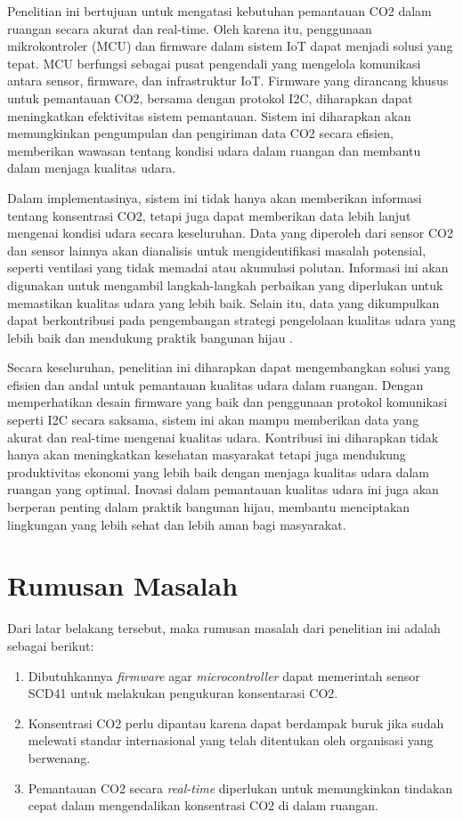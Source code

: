     Penelitian ini bertujuan untuk mengatasi kebutuhan pemantauan CO2 dalam ruangan secara akurat dan real-time.  Oleh karena itu, penggunaan mikrokontroler (MCU) dan firmware dalam sistem IoT dapat menjadi solusi yang tepat. MCU berfungsi sebagai pusat pengendali yang mengelola komunikasi antara sensor, firmware, dan infrastruktur IoT. Firmware yang dirancang khusus untuk pemantauan CO2, bersama dengan protokol I2C, diharapkan dapat meningkatkan efektivitas sistem pemantauan. Sistem ini diharapkan akan memungkinkan pengumpulan dan pengiriman data CO2 secara efisien, memberikan wawasan tentang kondisi udara dalam ruangan dan membantu dalam menjaga kualitas udara.
    
    Dalam implementasinya, sistem ini tidak hanya akan memberikan informasi tentang konsentrasi CO2, tetapi juga dapat memberikan data lebih lanjut mengenai kondisi udara secara keseluruhan. Data yang diperoleh dari sensor CO2 dan sensor lainnya akan dianalisis untuk mengidentifikasi masalah potensial, seperti ventilasi yang tidak memadai atau akumulasi polutan. Informasi ini akan digunakan untuk mengambil langkah-langkah perbaikan yang diperlukan untuk memastikan kualitas udara yang lebih baik. Selain itu, data yang dikumpulkan dapat berkontribusi pada pengembangan strategi pengelolaan kualitas udara yang lebih baik dan mendukung praktik bangunan hijau \cite{Marques2020Indoor}.
    
    Secara keseluruhan, penelitian ini diharapkan dapat mengembangkan solusi yang efisien dan andal untuk pemantauan kualitas udara dalam ruangan. Dengan memperhatikan desain firmware yang baik dan penggunaan protokol komunikasi seperti I2C secara saksama, sistem ini akan mampu memberikan data yang akurat dan real-time mengenai kualitas udara. Kontribusi ini diharapkan tidak hanya akan meningkatkan kesehatan masyarakat tetapi juga mendukung produktivitas ekonomi yang lebih baik dengan menjaga kualitas udara dalam ruangan yang optimal. Inovasi dalam pemantauan kualitas udara ini juga akan berperan penting dalam praktik bangunan hijau, membantu menciptakan lingkungan yang lebih sehat dan lebih aman bagi masyarakat.
    
\section{Rumusan Masalah}
Dari latar belakang tersebut, maka rumusan masalah dari penelitian ini adalah sebagai berikut:  

\begin{enumerate}
    \item Dibutuhkannya \textit{firmware} agar \textit{microcontroller} dapat memerintah sensor SCD41 untuk melakukan pengukuran konsentarasi CO2.
    \item Konsentrasi CO2 perlu dipantau karena dapat berdampak buruk jika sudah melewati standar internasional yang telah ditentukan oleh organisasi yang berwenang.
    \item Pemantauan CO2 secara \textit{real-time} diperlukan untuk memungkinkan tindakan cepat dalam mengendalikan konsentrasi CO2 di dalam ruangan.
\end{enumerate}

